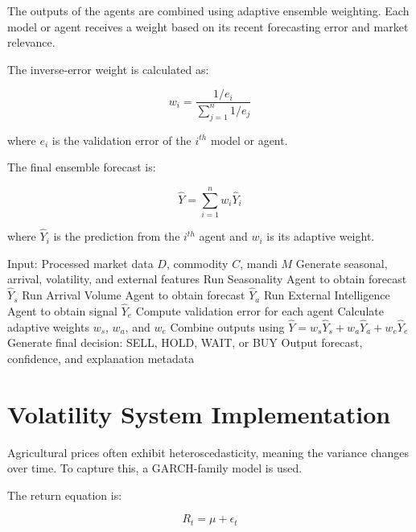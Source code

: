 \documentclass[12pt,a4paper]{report}
\begin{document}
The outputs of the agents are combined using adaptive ensemble weighting. Each model or agent receives a weight based on its recent forecasting error and market relevance.

The inverse-error weight is calculated as:

\begin{equation}
w_i = \frac{1/e_i}{\sum_{j=1}^{n} 1/e_j}
\end{equation}

where $e_i$ is the validation error of the $i^{th}$ model or agent.

The final ensemble forecast is:

\begin{equation}
\hat{Y} = \sum_{i=1}^{n} w_i \hat{Y}_i
\end{equation}

where $\hat{Y}_i$ is the prediction from the $i^{th}$ agent and $w_i$ is its adaptive weight.

\begin{algorithm}[H]
\caption{Adaptive Multi-Agent Forecasting}
\begin{algorithmic}[1]
\State Input: Processed market data $D$, commodity $C$, mandi $M$
\State Generate seasonal, arrival, volatility, and external features
\State Run Seasonality Agent to obtain forecast $\hat{Y}_s$
\State Run Arrival Volume Agent to obtain forecast $\hat{Y}_a$
\State Run External Intelligence Agent to obtain signal $\hat{Y}_e$
\State Compute validation error for each agent
\State Calculate adaptive weights $w_s$, $w_a$, and $w_e$
\State Combine outputs using $\hat{Y} = w_s\hat{Y}_s + w_a\hat{Y}_a + w_e\hat{Y}_e$
\State Generate final decision: SELL, HOLD, WAIT, or BUY
\State Output forecast, confidence, and explanation metadata
\end{algorithmic}
\end{algorithm}

\section{Volatility System Implementation}

Agricultural prices often exhibit heteroscedasticity, meaning the variance changes over time. To capture this, a GARCH-family model is used.

The return equation is:

\begin{equation}
R_t = \mu + \epsilon_t
\end{equation}
\end{document}
